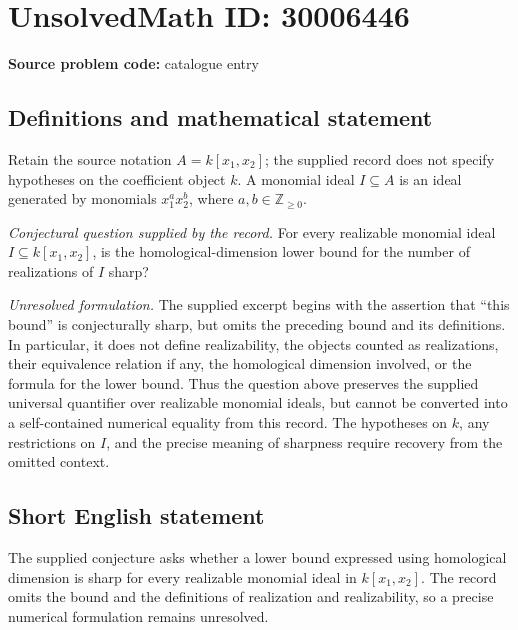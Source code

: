 \documentclass[11pt]{article}
\newcommand{\Z}{\mathbb{Z}}
\begin{document}
\section*{UnsolvedMath ID: 30006446}
\textbf{Source problem code:} catalogue entry
\subsection{Definitions and mathematical statement}
Retain the source notation \(A=k[x_1,x_2]\); the supplied record does not specify hypotheses on the coefficient object \(k\). A monomial ideal \(I\subseteq A\) is an ideal generated by monomials \(x_1^a x_2^b\), where \(a,b\in\Z_{\geq 0}\).

\emph{Conjectural question supplied by the record.} For every realizable monomial ideal \(I\subseteq k[x_1,x_2]\), is the homological-dimension lower bound for the number of realizations of \(I\) sharp?

\emph{Unresolved formulation.} The supplied excerpt begins with the assertion that ``this bound'' is conjecturally sharp, but omits the preceding bound and its definitions. In particular, it does not define realizability, the objects counted as realizations, their equivalence relation if any, the homological dimension involved, or the formula for the lower bound. Thus the question above preserves the supplied universal quantifier over realizable monomial ideals, but cannot be converted into a self-contained numerical equality from this record. The hypotheses on \(k\), any restrictions on \(I\), and the precise meaning of sharpness require recovery from the omitted context.
\subsection{Short English statement}
The supplied conjecture asks whether a lower bound expressed using homological dimension is sharp for every realizable monomial ideal in \(k[x_1,x_2]\). The record omits the bound and the definitions of realization and realizability, so a precise numerical formulation remains unresolved.
\end{document}
